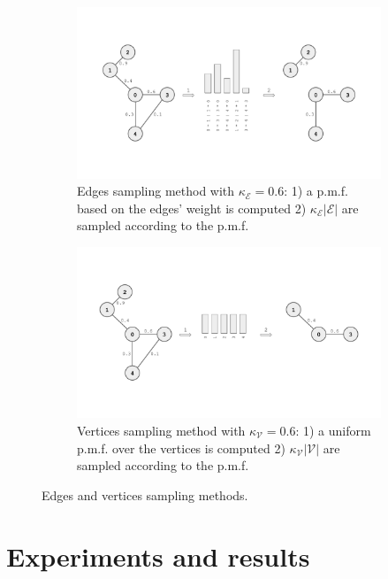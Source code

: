 \documentclass{article}
\begin{document}
\begin{figure}[h!] 
    \centering
    \begin{subfigure}[b]{0.48\textwidth}
        \centering
        \includegraphics[width=\textwidth]{Images/edge_sampling.pdf}
        \caption{Edges sampling method with $\kappa_\mathcal{E} = 0.6$: 1) a p.m.f. based on the edges' weight is computed 2) $\kappa_\mathcal{E} |\mathcal{E}|$ are sampled according to the p.m.f.}
    \end{subfigure}
    \hfill
    \begin{subfigure}[b]{0.48\textwidth}
        \centering
        \includegraphics[width=\textwidth]{Images/vertex_sampling.pdf}
        \caption{Vertices sampling method with $\kappa_\mathcal{V} = 0.6$: 1) a uniform p.m.f. over the vertices is computed 2) $\kappa_\mathcal{V} |\mathcal{V}|$ are sampled according to the p.m.f.}
    \end{subfigure}
    \caption{Edges and vertices sampling methods.}
    \label{fig:sampling}
\end{figure}

\section{Experiments and results} \label{sec:experiments_and_results}
\end{document}
